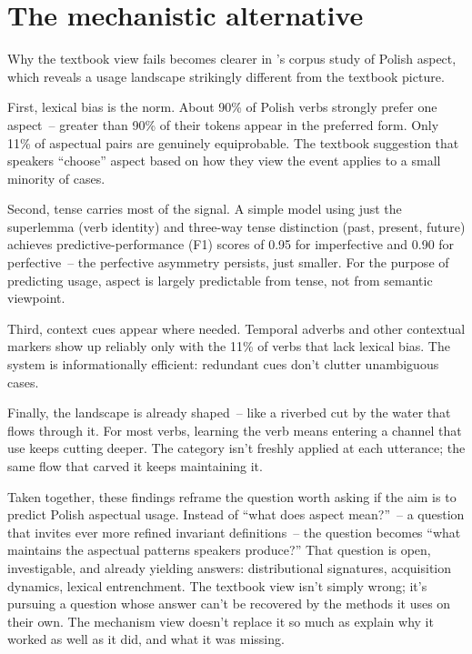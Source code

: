 \section{The mechanistic alternative}
\label{sec:7:mechanistic-alternative}

Why the textbook view fails becomes clearer in \textcite{divjak2024aspect}'s corpus study of Polish aspect, which reveals a usage landscape strikingly different from the textbook picture.

First, lexical bias is the norm. About 90\% of Polish verbs strongly prefer one aspect~-- greater than 90\% of their tokens appear in the preferred form. Only 11\% of aspectual pairs are genuinely equiprobable. The textbook suggestion that speakers \enquote{choose} aspect based on how they view the event applies to a small minority of cases.

Second, tense carries most of the signal. A simple model using just the superlemma (verb identity) and three-way tense distinction (past, present, future) achieves predictive-performance (F1) scores of 0.95 for imperfective and 0.90 for perfective~-- the perfective asymmetry persists, just smaller. For the purpose of predicting usage, aspect is largely predictable from tense, not from semantic viewpoint.

Third, context cues appear where needed. Temporal adverbs and other contextual markers show up reliably only with the 11\% of verbs that lack lexical bias. The system is informationally efficient: redundant cues don't clutter unambiguous cases.

Finally, the landscape is already shaped~-- like a riverbed cut by the water that flows through it. For most verbs, learning the verb means entering a channel that use keeps cutting deeper. The category isn't freshly applied at each utterance; the same flow that carved it keeps maintaining it.

Taken together, these findings reframe the question worth asking if the aim is to predict Polish aspectual usage. Instead of \enquote{what does aspect mean?}~-- a question that invites ever more refined invariant definitions~-- the question becomes \enquote{what maintains the aspectual patterns speakers produce?} That question is open, investigable, and already yielding answers: distributional signatures, acquisition dynamics, lexical entrenchment. The textbook view isn't simply wrong; it's pursuing a question whose answer can't be recovered by the methods it uses on their own. The mechanism view doesn't replace it so much as explain why it worked as well as it did, and what it was missing.


